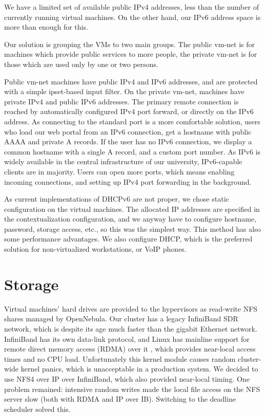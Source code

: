 \documentclass{llncs}
\begin{document}
   We have a limited set of available public IPv4 addresses, less than the number of currently running virtual machines. On the other hand, our IPv6 address space is more than enough for this.

   Our solution is grouping the VMs to two main groups. The public vm-net is for machines which provide public services to more people, the private vm-net is for those which are used only by one or two persons.

   Public vm-net machines have public IPv4 and IPv6 addresses, and are protected with a simple ipset-based input filter. On the private vm-net, machines have private IPv4 and public IPv6 addresses. The primary remote connection is reached by automatically configured IPv4 port forward, or directly on the IPv6 address. As connecting to the standard port is a more comfortable solution, users who load our web portal from an IPv6 connection, get a hostname with public AAAA and private A records. If the user has no IPv6 connection, we display a common hostname with a single A record, and a custom port number. As IPv6 is widely available in the central infrastructure of our university, IPv6-capable clients are in majority. Users can open more ports, which means enabling incoming connections, and setting up IPv4 port forwarding in the background.

   As current implementations of DHCPv6 are not proper, we chose static configuration on the virtual machines. The allocated IP addresses are specified in the contextualization configuration, and we anyway have to configure hostname, password, storage access, etc., so this was the simplest way. This method has also some performance advantages. We also configure DHCP, which is the preferred solution for non-virtualized workstations, or VoIP phones.
   \section{Storage}
   Virtual machines' hard drives are provided to the hypervisors as read-write NFS shares managed by OpenNebula. Our cluster has a legacy InfiniBand SDR network, which is despite its age much faster than the gigabit Ethernet network. InfiniBand has its own data-link protocol, and Linux has mainline support for remote direct memory access (RDMA) over it  , which provides near-local access times and no CPU load.\cite{callaghan2002nfs} Unfortunately this kernel module causes random cluster-wide kernel panics, which is unacceptable in a production system. We decided to use NFS4 over IP over InfiniBand, which also provided near-local timing. One problem remained: intensive random writes made the local file access on the NFS server slow (both with RDMA and IP over IB). Switching to the deadline scheduler solved this.
\end{document}
